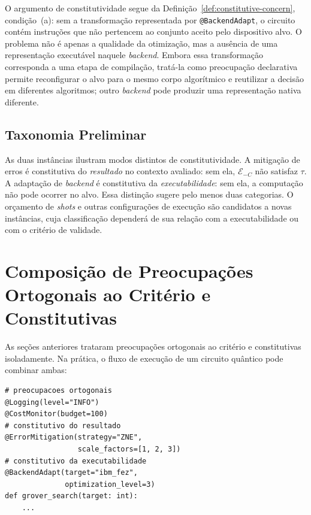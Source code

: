 \documentclass[sigconf]{acmart}
\begin{document}
O argumento de constitutividade segue da Definição~\ref{def:constitutive-concern}, condição~(a): sem a transformação representada por \texttt{@BackendAdapt}, o circuito contém instruções que não pertencem ao conjunto aceito pelo dispositivo alvo. O problema não é apenas a qualidade da otimização, mas a ausência de uma representação executável naquele \textit{backend}. Embora essa transformação corresponda a uma etapa de compilação, tratá-la como preocupação declarativa permite reconfigurar o alvo para o mesmo corpo algorítmico e reutilizar a decisão em diferentes algoritmos; outro \textit{backend} pode produzir uma representação nativa diferente.

\subsection{Taxonomia Preliminar}

As duas instâncias ilustram modos distintos de constitutividade. A mitigação de erros é constitutiva do \textit{resultado} no contexto avaliado: sem ela, $\mathcal{E}_{-C}$ não satisfaz $\tau$. A adaptação de \textit{backend} é constitutiva da \textit{executabilidade}: sem ela, a computação não pode ocorrer no alvo. Essa distinção sugere pelo menos duas categorias. O orçamento de \textit{shots} e outras configurações de execução são candidatos a novas instâncias, cuja classificação dependerá de sua relação com a executabilidade ou com o critério de validade.

\section{Composição de Preocupações Ortogonais ao Critério e Constitutivas}
\label{sec:composition}

As seções anteriores trataram preocupações ortogonais ao critério e constitutivas isoladamente. Na prática, o fluxo de execução de um circuito quântico pode combinar ambas:

\begin{lstlisting}[float=tbp, caption={Composição de preocupações ortogonais e constitutivas via decoradores.}, label={lst:composition}]
# preocupacoes ortogonais
@Logging(level="INFO")
@CostMonitor(budget=100)
# constitutivo do resultado
@ErrorMitigation(strategy="ZNE",
                 scale_factors=[1, 2, 3])
# constitutivo da executabilidade
@BackendAdapt(target="ibm_fez",
              optimization_level=3)
def grover_search(target: int):
    ...
\end{lstlisting}
\end{document}
